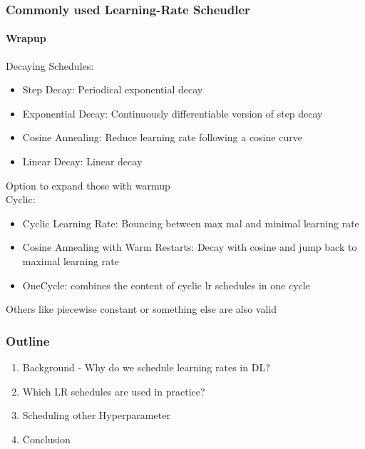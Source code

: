\documentclass[10pt,aspectratio=169]{beamer}
\begin{document}
    \begin{frame}
        \frametitle{Commonly used Learning-Rate Scheudler}
        \framesubtitle{Wrapup}

        Decaying Schedules:
        \begin{itemize}
            \item Step Decay: Periodical exponential decay
            \item Exponential Decay: Continuously differentiable version of step decay 
            \item Cosine Annealing: Reduce learning rate following a cosine curve
            \item Linear Decay: Linear decay
        \end{itemize}
        Option to expand those with warmup \\
        \vspace{0.5cm}
        Cyclic:
        \begin{itemize}
            \item Cyclic Learning Rate: Bouncing between max mal and minimal learning rate
            \item Cosine Annealing with Warm Restarts: Decay with cosine and jump back to maximal learning rate
            \item OneCycle: combines the content of cyclic lr schedules in one cycle
        \end{itemize}

        Others like piecewise constant or something else are also valid
        
    \end{frame}

    \begin{darkframe}
        \frametitle{Outline}
        \begin{enumerate}
            \item Background - Why do we schedule learning rates in DL?
            \item Which LR schedules are used in practice?
            \item Scheduling other Hyperparameter
            \item Conclusion
        \end{enumerate}
    \end{darkframe}
\end{document}
